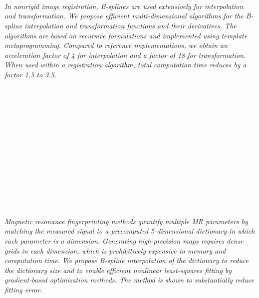 \begin{multicols}{2}
        \\\\
\\
      \textit{In nonrigid image registration, B-splines are used extensively for interpolation and transformation. We propose efficient multi-dimensional algorithms for the B-spline interpolation and transformation functions and their derivatives. The algorithms are based on recursive formulations and implemented using template metaprogramming. Compared to reference implementations, we obtain an acceleration factor of 4 for interpolation and a factor of 18 for transformation. When used within a registration algorithm, total computation time reduces by a factor 1.5 to 3.5.}\\
\\ 
        \\
        \\\\
        \\
        \\\\
        \\
        \\\\
        \\
        \\\\
\\
      \textit{Magnetic resonance fingerprinting methods quantify multiple MR parameters by matching the measured signal to a precomputed 5-dimensional dictionary in which each parameter is a dimension. Generating high-precision maps requires dense grids in each dimension, which is prohibitively expensive in memory and computation time. We propose B-spline interpolation of the dictionary to reduce the dictionary size and to enable efficient nonlinear least-squares fitting by gradient-based optimization methods. The method is shown to substantially reduce fitting error.}\\
\\ 
        \\
        \\\\
        \\
        \\\\

\end{multicols}
